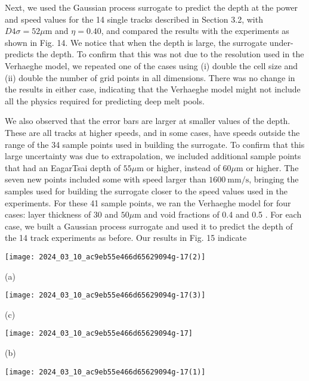 \documentclass[10pt]{article}
\begin{document}
Next, we used the Gaussian process surrogate to predict the depth at the power and speed values for the 14 single tracks described in Section 3.2, with $D 4 \sigma=52 \mu \mathrm{m}$ and $\eta=0.40$, and compared the results with the experiments as shown in Fig. 14. We notice that when the depth is large, the surrogate under-predicts the depth. To confirm that this was not due to the resolution used in the Verhaeghe model, we repeated one of the cases using (i) double the cell size and (ii) double the number of grid points in all dimensions. There was no change in the results in either case, indicating that the Verhaeghe model might not include all the physics required for predicting deep melt pools.

We also observed that the error bars are larger at smaller values of the depth. These are all tracks at higher speeds, and in some cases, have speeds outside the range of the 34 sample points used in building the surrogate. To confirm that this large uncertainty was due to extrapolation, we included additional sample points that had an EagarTsai depth of $55 \mu \mathrm{m}$ or higher, instead of $60 \mu \mathrm{m}$ or higher. The seven new points included some with speed larger than $1600 \mathrm{~mm} / \mathrm{s}$, bringing the samples used for building the surrogate closer to the speed values used in the experiments. For these 41 sample points, we ran the Verhaeghe model for four cases: layer thickness of 30 and $50 \mu \mathrm{m}$ and void fractions of 0.4 and 0.5 . For each case, we built a Gaussian process surrogate and used it to predict the depth of the 14 track experiments as before. Our results in Fig. 15 indicate

\begin{center}
\texttt{[image: 2024\_03\_10\_ac9eb55e466d65629094g-17(2)]}
\end{center}

(a)

\begin{center}
\texttt{[image: 2024\_03\_10\_ac9eb55e466d65629094g-17(3)]}
\end{center}

(c)

\begin{center}
\texttt{[image: 2024\_03\_10\_ac9eb55e466d65629094g-17]}
\end{center}

(b)

\begin{center}
\texttt{[image: 2024\_03\_10\_ac9eb55e466d65629094g-17(1)]}
\end{center}
\end{document}
